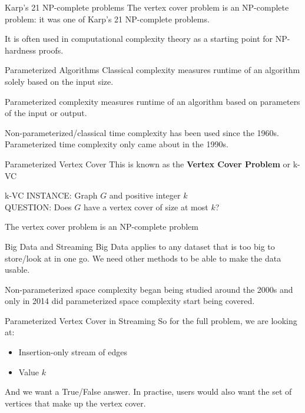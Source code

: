 \documentclass{beamer}
\begin{document}
\begin{frame}{Karp's 21 NP-complete problems}
    The vertex cover problem is an NP-complete problem: it was one of Karp's 21 NP-complete problems.

    It is often used in computational complexity theory as a starting point for NP-hardness proofs.
\end{frame}

\begin{frame}{Parameterized Algorithms}
    Classical complexity measures runtime of an algorithm solely based on the input size.

    Parameterized complexity measures runtime of an algorithm based on parameters of the input or output.

    \hfill

    Non-parameterized/classical time complexity has been used since the 1960s. Parameterized time complexity only came about in the 1990s.
\end{frame}

\begin{frame}{Parameterized Vertex Cover}
    This is known as the \textbf{Vertex Cover Problem} or k-VC

    \hfill

    \begin{alertblock}{k-VC}
        INSTANCE: Graph $G$ and positive integer $k$\\
        QUESTION: Does $G$ have a vertex cover of size at most $k$?\\
    \end{alertblock}

    \hfill

    The vertex cover problem is an NP-complete problem
\end{frame}

\begin{frame}{Big Data and Streaming}
    Big Data applies to any dataset that is too big to store/look at in one go. We need other methods to be able to make the data usable.

    \hfill

    Non-parameterized space complexity began being studied around the 2000s and only in 2014 did parameterized space complexity start being covered.
\end{frame}

\begin{frame}{Parameterized Vertex Cover in Streaming}
    So for the full problem, we are looking at:

    \begin{itemize}
        \item Insertion-only stream of edges
        \item Value $k$
    \end{itemize}

    And we want a True/False answer. In practise, users would also want the set of vertices that make up the vertex cover.
\end{frame}
\end{document}
